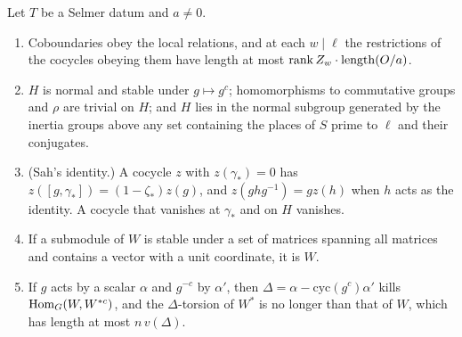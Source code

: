 \begin{lemma}\label{lem:selmer-basics}
Let $T$ be a Selmer datum and $a\ne0$.
\begin{enumerate}[label=\textup{(\alph*)}]
\item Coboundaries obey the local relations, and at each $w\mid\ell$ the restrictions of the cocycles obeying them have length at most $\operatorname{rank} Z_w\cdot\operatorname{length}(O/a)$.
\item $H$ is normal and stable under $g\mapsto g^c$; homomorphisms to commutative groups and $\rho$ are trivial on $H$; and $H$ lies in the normal subgroup generated by the inertia groups above any set containing the places of $S$ prime to $\ell$ and their conjugates.
\item (Sah's identity.) A cocycle $z$ with $z(\gamma_*)=0$ has $z([g,\gamma_*])=(1-\zeta_*)z(g)$, and $z(ghg^{-1})=gz(h)$ when $h$ acts as the identity. A cocycle that vanishes at $\gamma_*$ and on $H$ vanishes.
\item If a submodule of $W$ is stable under a set of matrices spanning all matrices and contains a vector with a unit coordinate, it is $W$.
\item If $g$ acts by a scalar $\alpha$ and $g^{-c}$ by $\alpha'$, then $\Delta=\alpha-\mathrm{cyc}(g^c)\alpha'$ kills $\operatorname{Hom}_G(W,W^{*c})$, and the $\Delta$-torsion of $W^*$ is no longer than that of $W$, which has length at most $n\,v(\Delta)$.
\end{enumerate}
\end{lemma}


